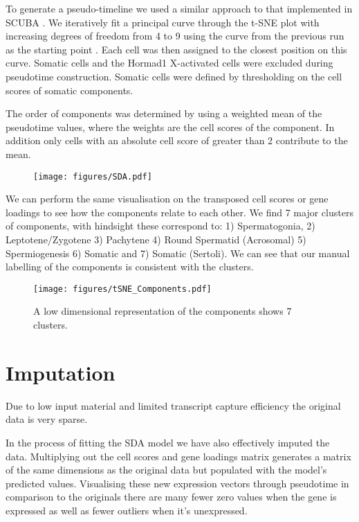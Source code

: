 To generate a pseudo-timeline we used a similar approach to that implemented in SCUBA \cite{Marco2014Bifurcation}. We iteratively fit a principal curve through the t-SNE plot with increasing degrees of freedom from 4 to 9 using the curve from the previous run as the starting point \cite{Hastie1989Principal}. Each cell was then assigned to the closest position on this curve. Somatic cells and the Hormad1 X-activated cells were excluded during pseudotime construction. Somatic cells were defined by thresholding on the cell scores of somatic components.

The order of components was determined by using a weighted mean of the pseudotime values, where the weights are the cell scores of the component. In addition only cells with an absolute cell score of greater than 2 contribute to the mean.

\begin{figure}[H]
	\centering
	\texttt{[image: figures/SDA.pdf]}
	\caption{}
	\label{fig:SDA}
\end{figure}

We can perform the same visualisation on the transposed cell scores or gene loadings to see how the components relate to each other. We find 7 major clusters of components, with hindsight these correspond to: 1) Spermatogonia, 2) Leptotene/Zygotene 3) Pachytene 4) Round Spermatid (Acrosomal) 5) Spermiogenesis 6) Somatic and 7) Somatic (Sertoli). We can see that our manual labelling of the components is consistent with the clusters.

\begin{figure}[H]
	\centering
	\texttt{[image: figures/tSNE\_Components.pdf]}
	\caption{A low dimensional representation of the components shows 7 clusters.}
	\label{fig:tSNE_Components}
\end{figure}



\section{Imputation}

Due to low input material and limited transcript capture efficiency the original data is very sparse. 

In the process of fitting the SDA model we have also effectively imputed the data. Multiplying out the cell scores and gene loadings matrix generates a matrix of the same dimensions as the original data but populated with the model's predicted values. Visualising these new expression vectors through pseudotime in comparison to the originals there are many fewer zero values when the gene is expressed as well as fewer outliers when it's unexpressed.

